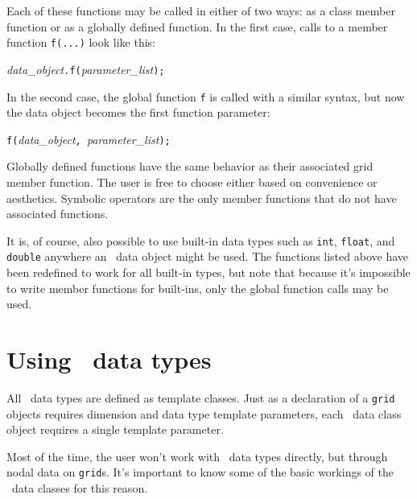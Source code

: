 Each of these functions may be called in either of two ways: as a class member function or as a globally defined function.  In the first case, calls to a member function {\tt f(...)} look like this:
\begin{center}
{\it data\_object}{\tt .f(}{\it parameter\_list}{\tt );}
\end{center}
In the second case, the global function {\tt f} is called with a similar syntax, but now the data object becomes the first function parameter:
\begin{center}
{\tt f(}{\it data\_object}{\tt, }{\it parameter\_list}{\tt );}
\end{center}
Globally defined functions have the same behavior as their associated grid member function.  The user is free to choose either based on convenience or aesthetics.  Symbolic operators are the only member functions that do not have associated functions.

It is, of course, also possible to use built-in data types such as {\tt int}, {\tt float}, and {\tt double} anywhere an \MMSP\ data object might be used.  The functions listed above have been redefined to work for all built-in types, but note that because it's impossible to write member functions for built-ins, only the global function calls may be used.

\section{Using \MMSP\ data types}
All \MMSP\ data types are defined as template classes.  Just as a declaration of a {\tt grid} objects requires dimension and data type template parameters, each \MMSP\ data class object requires a single template parameter.

Most of the time, the user won't work with \MMSP\ data types directly, but through nodal data on {\tt grid}s.  It's important to know some of the basic workings of the \MMSP\ data classes for this reason.

